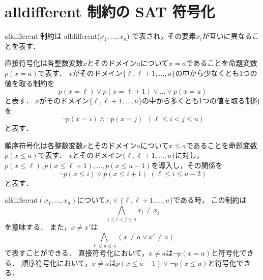 \section{alldifferent 制約の SAT 符号化}

alldifferent 制約は alldifferent($x_1,\dots,x_n$) で表され，その要素$x_i$が互いに異なることを表す．

直接符号化は各整数変数$x$とそのドメイン$a$について$x=a$であることを命題変数$p(x=a)$で表す．
$x$がそのドメイン$\{\ell,\ell+1,\dots,u\}$の中から少なくとも1つの値を取る制約を
$$p(x=\ell) \lor p(x=\ell+1) \lor \dots \lor p(x=u)$$
と表す．
$x$がそのドメイン$\{\ell,\ell+1,\dots,u\}$の中から多くとも1つの値を取る制約を
$$\lnot p(x=i) \land \lnot p(x=j) \;\; (\ell \leq i < j \leq u)$$
と表す．

順序符号化は各整数変数$x$とそのドメイン$a$について$x \leq a$であることを命題変数$p(x\leq a)$で表す．
$x$とそのドメイン$\{\ell,\ell+1,\dots,u\}$に対し，$p(x \leq \ell),p(x \leq \ell+1),\dots,p(x \leq u-1)$を導入し，その関係を
$$\lnot p(x \leq i) \lor p(x \leq i+1) \; (\ell \leq i \leq u-2)$$
と表す．


alldifferent$(x_1,\dots,x_n)$について$x_i\in \{ \ell,\ell+1,\dots,u \}$である時，
この制約は
$$\bigwedge_{1 \leq i < j \leq n} x_i \neq x_j$$
を意味する．
また，$x \neq x'$は
$$
\bigwedge_{\ell \leq a \leq u} (x \neq a \lor x' \neq a)
$$
で表すことができる．
直接符号化において，$x \neq a$は$\lnot p(x=a)$と符号化できる．
順序符号化において，$x \neq a$は$p(x \leq a-1) \lor \lnot p(x \leq a)$と符号化できる．





